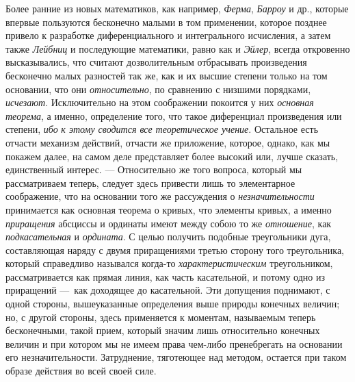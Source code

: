 {Более ранние из новых математиков, как например,
{\em Ферма}, {\em Барроу} и др.,
которые впервые пользуются бесконечно малыми в том применении, которое
позднее привело к разработке диференциального и интегрального исчисления, а
затем также {\em Лейбниц} и последующие математики,
равно как и {\em Эйлер}, всегда откровенно
высказывались, что считают дозволительным отбрасывать произведения
бесконечно малых разностей так же, как и их высшие степени только на том
основании, что они {\em относительно}, по сравнению с
низшими порядками, {\em исчезают}. Исключительно на
этом соображении покоится у них {\em основная теорема},
а именно, определение того, что такое диференциал произведения или степени,
{\em ибо }{\em к этому сводится все
теоретическое учение}. Остальное есть отчасти механизм действий, отчасти же
приложение, которое, однако, как мы покажем далее, на самом деле
представляет более высокий или, лучше сказать, единственный интерес. —
Относительно же того вопроса, который мы рассматриваем теперь, следует
здесь привести лишь то элементарное соображение, что на основании того же
рассуждения о {\em незначительности} принимается как
основная теорема о кривых, что элементы кривых, а именно
{\em приращения} абсциссы и ординаты имеют между собою
то же {\em отношение}, как
{\em подкасательная} и
{\em ордината}. С целью получить подобные треугольники
дуга, составляющая наряду с двумя приращениями третью сторону того
треугольника, который справедливо назывался когда-то
{\em характеристическим} треугольником, рассматривается
как прямая линия, как часть касательной, и потому одно из приращений —~как
доходящее до касательной. Эти допущения поднимают, с одной стороны,
вышеуказанные определения выше природы конечных величин; но, с другой
стороны, здесь применяется к моментам, называемым теперь бесконечными,
такой прием, который значим лишь относительно конечных величин и при
котором мы не имеем права чем-либо пренебрегать на основании его
незначительности. Затруднение, тяготеющее над методом, остается при таком
образе действия во всей своей силе.

}
